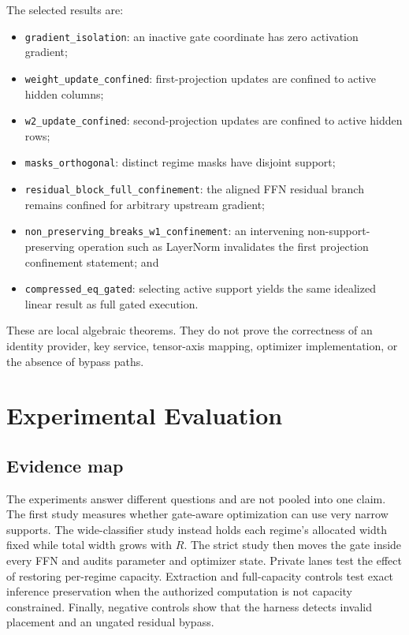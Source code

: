 \documentclass[11pt]{article}
\begin{document}
The selected results are:
\begin{itemize}
  \item \texttt{gradient\_isolation}: an inactive gate coordinate has zero
  activation gradient;
  \item \texttt{weight\_update\_confined}: first-projection updates are
  confined to active hidden columns;
  \item \texttt{w2\_update\_confined}: second-projection updates are confined
  to active hidden rows;
  \item \texttt{masks\_orthogonal}: distinct regime masks have disjoint
  support;
  \item \texttt{residual\_block\_full\_confinement}: the aligned FFN residual
  branch remains confined for arbitrary upstream gradient;
  \item \texttt{non\_preserving\_breaks\_w1\_confinement}: an intervening
  non-support-preserving operation such as LayerNorm invalidates the first
  projection confinement statement; and
  \item \texttt{compressed\_eq\_gated}: selecting active support yields the
  same idealized linear result as full gated execution.
\end{itemize}

These are local algebraic theorems. They do not prove the correctness of an
identity provider, key service, tensor-axis mapping, optimizer implementation,
or the absence of bypass paths.

\section{Experimental Evaluation}

\subsection{Evidence map}

The experiments answer different questions and are not pooled into one claim.
The first study measures whether gate-aware optimization can use very narrow
supports. The wide-classifier study instead holds each regime's allocated width
fixed while total width grows with $R$. The strict study then moves the gate
inside every FFN and audits
parameter and optimizer state. Private lanes test the effect of restoring
per-regime capacity. Extraction and full-capacity controls test exact inference
preservation when the authorized computation is not capacity constrained.
Finally, negative controls show that the harness detects invalid placement and
an ungated residual bypass.
\end{document}
